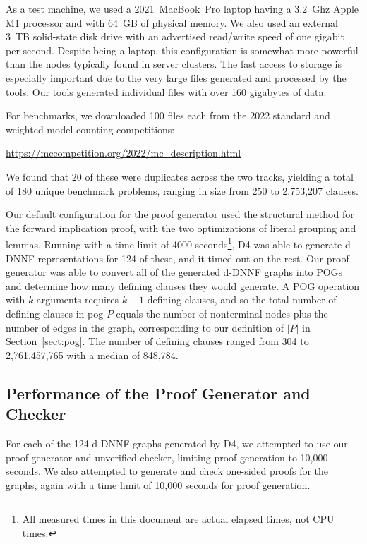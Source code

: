 \documentclass[letterpaper,USenglish,cleveref, autoref, thm-restate]{lipics-v2021}
\newcommand{\progname}[1]{\textsc{#1}}
\newcommand{\dfour}{\progname{D4}}
\begin{document}
As a test machine, we used a 2021~MacBook~Pro laptop having a 3.2~Ghz
Apple M1 processor and with 64~GB of physical memory.  We also used an
external 3~TB solid-state disk drive with an advertised read/write
speed of one gigabit per second.  Despite being a laptop, this
configuration is somewhat more powerful than the nodes typically
found in server clusters.  The fast access to storage is especially
important due to the very large files generated and processed by the
tools.  Our tools generated individual files with over 160 gigabytes
of data.

For benchmarks, we downloaded 100 files each from the 2022 standard and weighted model counting competitions:
\begin{center}
       \url{https://mccompetition.org/2022/mc_description.html}
\end{center}
We found that 20 of these were duplicates across the two tracks,
yielding a total of 180 unique benchmark problems, ranging in size
from 250 to 2,753,207 clauses.

Our default configuration for the proof generator used the structural
method for the forward implication proof, with the two optimizations
of literal grouping and lemmas.
Running with a time limit of 4000 seconds\footnote{All measured times
in this document are actual elapsed times, not CPU times.}, \dfour{}
was able to generate d-DNNF representations for 124 of these, and it timed out on the
rest.  Our proof generator was able to convert all of the generated
d-DNNF graphs into POGs and determine how many defining clauses they
would generate.  A POG operation with $k$ arguments requires $k+1$
defining clauses, and so the total number of defining clauses in pog $P$ equals
the number of nonterminal nodes plus the number of edges in the graph, corresponding to our definition of $|P|$ in Section~\ref{sect:pog}.
The number of defining clauses ranged from 304 to 2,761,457,765 with a median of 848,784.

\subsection{Performance of the Proof Generator and Checker}



For each of the 124 d-DNNF graphs generated by \dfour{}, we attempted
to use our proof generator and unverified checker, limiting proof
generation to 10,000 seconds.  We also attempted to generate and check
one-sided proofs for the graphs, again with a time limit of 10,000
seconds for proof generation.
\end{document}
